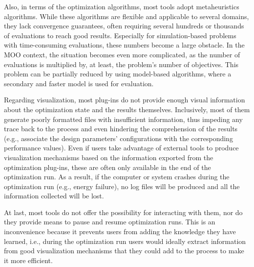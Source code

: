 	
	Also, in terms of the optimization algorithms, most tools adopt metaheuristics algorithms. While these algorithms are flexible and applicable to several domains, they lack convergence guarantees, often requiring several hundreds or thousands of evaluations to reach good results. Especially for simulation-based problems with time-consuming evaluations, these numbers become a large obstacle. In the \ac{MOO} context, the situation becomes even more complicated, as the number of evaluations is multiplied by, at least, the problem's number of objectives. This problem can be partially reduced by using model-based algorithms, where a secondary and faster model is used for evaluation.
	
	Regarding visualization, most plug-ins do not provide enough visual information about the optimization state and the results themselves. Inclusively, most of them generate poorly formatted files with insufficient information, thus impeding any trace back to the process and even hindering the comprehension of the results (e.g., associate the design parameters' configurations with the corresponding performance values). Even if users take advantage of external tools to produce visualization mechanisms based on the information exported from the optimization plug-ins, these are often only available in the end of the optimization run. As a result, if the computer or system crashes during the optimization run (e.g., energy failure), no log files will be produced and all the information collected will be lost. 
	
	At last, most tools do not offer the possibility for interacting with them, nor do they provide means to pause and resume optimization runs. This is an inconvenience because it prevents users from adding the knowledge they have learned, i.e., during the optimization run users would ideally extract information from good visualization mechanisms that they could add to the process to make it more efficient.
	
